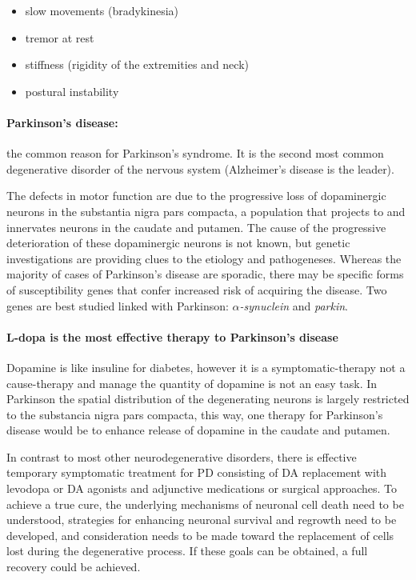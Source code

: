 \documentclass[12pt,article,oneside,a4paper]{memoir}
\begin{document}
\begin{itemize}
\item slow movements (bradykinesia)
\item tremor at rest
\item stiffness (rigidity of the extremities and neck)
\item postural instability
\end{itemize}

\paragraph{Parkinson's disease:} the common reason for Parkinson's syndrome. It is the second most common degenerative disorder of the nervous system (Alzheimer's disease is the leader).

The defects in motor function are due to the progressive loss of dopaminergic neurons in the substantia nigra pars compacta, a population that projects to and innervates neurons in the caudate and putamen.
The cause of the progressive deterioration of these dopaminergic neurons is not known, but genetic investigations are providing clues to the etiology and pathogeneses. Whereas the majority of cases of Parkinson’s disease are sporadic, there may be specific forms of susceptibility genes that confer increased risk of acquiring the disease. Two genes are best studied linked with Parkinson: \textit{$\alpha$-synuclein} and \textit{parkin}.

\paragraph{L-dopa is the most effective therapy to Parkinson's disease}
Dopamine is like insuline for diabetes, however it is a symptomatic-therapy not a cause-therapy and manage the quantity of dopamine is not an easy task.
In Parkinson the spatial distribution of the degenerating neurons is largely restricted to the substancia nigra pars compacta, this way, one therapy for Parkinson’s disease would be to enhance release of dopamine in the caudate and putamen.

In contrast to most other neurodegenerative disorders, there is effective temporary symptomatic treatment for PD consisting of DA replacement with levodopa or DA agonists and adjunctive medications or surgical approaches. To achieve a true cure, the underlying mechanisms of neuronal cell death need to be understood, strategies for enhancing neuronal survival and regrowth need to be developed, and consideration needs to be made toward the replacement of cells lost during the degenerative process. If these goals can be obtained, a full recovery could be achieved.
\end{document}
